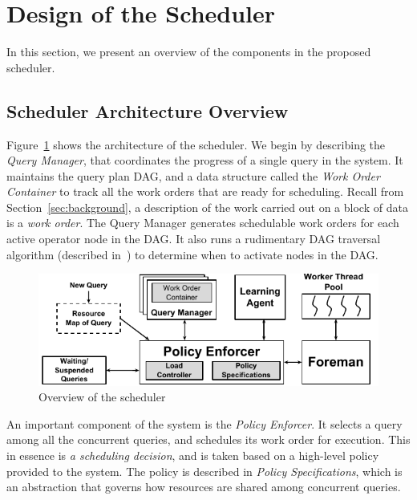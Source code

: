 \section{Design of the Scheduler}\label{sec:design}
In this section, we present an overview of the components in the proposed \sys{} scheduler.

\subsection{Scheduler Architecture Overview}\label{ssec:scheduler-arch}
Figure~\ref{fig:scheduler-architecture} shows the architecture of the \sys{} scheduler.
We begin by describing the \textit{Query Manager}, that coordinates the progress of a single query in the system.
It maintains the query plan DAG, and a data structure called
the \textit{Work Order Container} to track all the work orders that are ready for
scheduling. 
Recall from Section~\ref{sec:background}, a description of the work carried out on a block of data is a \textit{work order}. 
The Query Manager generates schedulable work orders for each active operator node in the DAG. 
It also runs a rudimentary DAG traversal algorithm (described in~\cite{supplement}) to determine when to activate nodes in the DAG. 

\begin{figure}[]
	\centering
	\includegraphics[width=\columnwidth]{figures/Scheduler-Architecture.pdf}
	\vspace*{-1.5em}
	\caption{Overview of the scheduler}
	\label{fig:scheduler-architecture}
	\vspace*{-1.5em}
\end{figure}

An important component of the system is the \textit{Policy Enforcer}.
It selects a query among all the concurrent queries, and schedules its work order for execution. 
This in essence is \textit{a scheduling decision}, and is taken based on a high-level policy provided to the system.
The policy is described in \textit{Policy Specifications}, which is an
abstraction that governs how resources are shared among concurrent queries. 

